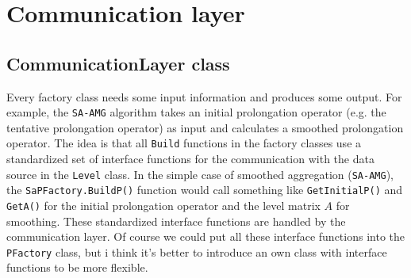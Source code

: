 \section{Communication layer}

\subsection{CommunicationLayer class}
Every factory class needs some input information and produces some output. For example, the \verb|SA-AMG| algorithm takes an initial prolongation operator (e.g. the tentative prolongation operator) as input and calculates a smoothed prolongation operator. The idea is that all \verb|Build| functions in the factory classes use a standardized set of interface functions for the communication with the data source in the \verb|Level| class. In the simple case of smoothed aggregation (\verb|SA-AMG|), the \verb|SaPFactory.BuildP()| function would call something like \verb|GetInitialP()| and \verb|GetA()| for the initial prolongation operator and the level matrix $A$ for smoothing. These standardized interface functions are handled by the communication layer. Of course we could put all these interface functions into the \verb|PFactory| class, but i think it's better to introduce an own class with interface functions to be more flexible.

